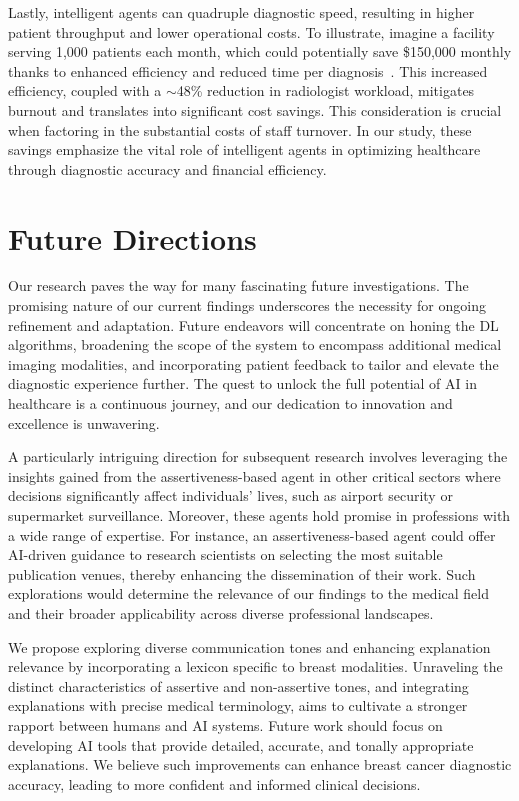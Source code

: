 \textcolor{revised}{Lastly, intelligent agents can quadruple diagnostic speed, resulting in higher patient throughput and lower operational costs.
To illustrate, imagine a facility serving 1,000 patients each month, which could potentially save \$150,000 monthly thanks to enhanced efficiency and reduced time per diagnosis~\cite{doi:10.1148/radiol.212631}.
This increased efficiency, coupled with a $\sim$48\% reduction in radiologist workload, mitigates burnout and translates into significant cost savings.
This consideration is crucial when factoring in the substantial costs of staff turnover.
In our study, these savings emphasize the vital role of intelligent agents in optimizing healthcare through diagnostic accuracy and financial efficiency.}

\section{Future Directions}
\label{sec:app005019}

\textcolor{revised}{Our research paves the way for many fascinating future investigations.
The promising nature of our current findings underscores the necessity for ongoing refinement and adaptation.
Future endeavors will concentrate on honing the \ac{DL} algorithms, broadening the scope of the system to encompass additional medical imaging modalities, and incorporating patient feedback to tailor and elevate the diagnostic experience further.
The quest to unlock the full potential of \ac{AI} in healthcare is a continuous journey, and our dedication to innovation and excellence is unwavering.}

\textcolor{revised}{A particularly intriguing direction for subsequent research involves leveraging the insights gained from the assertiveness-based agent in other critical sectors where decisions significantly affect individuals' lives, such as airport security or supermarket surveillance.
Moreover, these agents hold promise in professions with a wide range of expertise.
For instance, an assertiveness-based agent could offer \acs{AI}-driven guidance to research scientists on selecting the most suitable publication venues, thereby enhancing the dissemination of their work.
Such explorations would determine the relevance of our findings to the medical field and their broader applicability across diverse professional landscapes.}

\textcolor{revised}{We propose exploring diverse communication tones and enhancing explanation relevance by incorporating a lexicon specific to breast modalities.
Unraveling the distinct characteristics of assertive and non-assertive tones, and integrating explanations with precise medical terminology, aims to cultivate a stronger rapport between humans and \ac{AI} systems.
Future work should focus on developing \ac{AI} tools that provide detailed, accurate, and tonally appropriate explanations.
We believe such improvements can enhance breast cancer diagnostic accuracy, leading to more confident and informed clinical decisions.}

